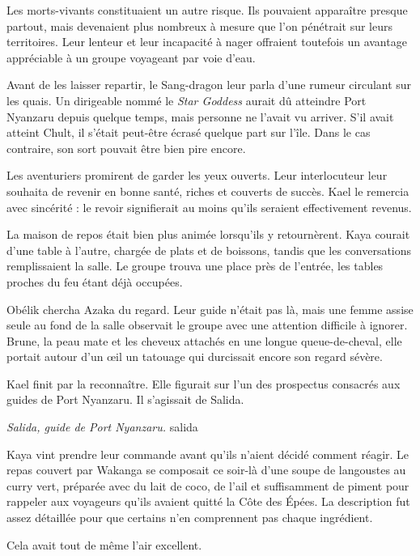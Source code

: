 Les morts-vivants constituaient un autre risque. Ils pouvaient apparaître presque partout, mais devenaient plus nombreux à mesure que l'on pénétrait sur leurs territoires. Leur lenteur et leur incapacité à nager offraient toutefois un avantage appréciable à un groupe voyageant par voie d'eau.

Avant de les laisser repartir, le Sang-dragon leur parla d'une rumeur circulant sur les quais. Un dirigeable nommé le \textit{Star Goddess} aurait dû atteindre Port Nyanzaru depuis quelque temps, mais personne ne l'avait vu arriver. S'il avait atteint Chult, il s'était peut-être écrasé quelque part sur l'île. Dans le cas contraire, son sort pouvait être bien pire encore.

Les aventuriers promirent de garder les yeux ouverts. Leur interlocuteur leur souhaita de revenir en bonne santé, riches et couverts de succès. Kael le remercia avec sincérité : le revoir signifierait au moins qu'ils seraient effectivement revenus.

\scenebreak

La maison de repos était bien plus animée lorsqu'ils y retournèrent. Kaya courait d'une table à l'autre, chargée de plats et de boissons, tandis que les conversations remplissaient la salle. Le groupe trouva une place près de l'entrée, les tables proches du feu étant déjà occupées.

Obélik chercha Azaka du regard. Leur guide n'était pas là, mais une femme assise seule au fond de la salle observait le groupe avec une attention difficile à ignorer. Brune, la peau mate et les cheveux attachés en une longue queue-de-cheval, elle portait autour d'un œil un tatouage qui durcissait encore son regard sévère.

Kael finit par la reconnaître. Elle figurait sur l'un des prospectus consacrés aux guides de Port Nyanzaru. Il s'agissait de Salida.

{\textit{Salida, guide de Port Nyanzaru.}}
{salida}

Kaya vint prendre leur commande avant qu'ils n'aient décidé comment réagir. Le repas couvert par Wakanga se composait ce soir-là d'une soupe de langoustes au curry vert, préparée avec du lait de coco, de l'ail et suffisamment de piment pour rappeler aux voyageurs qu'ils avaient quitté la Côte des Épées. La description fut assez détaillée pour que certains n'en comprennent pas chaque ingrédient.

Cela avait tout de même l'air excellent.

